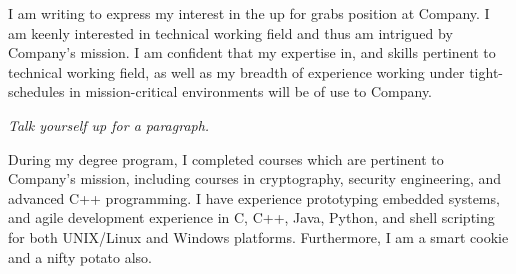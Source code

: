 \documentclass{coverletter}
\newcommand{\company}{Company}
\newcommand{\position}{up for grabs}
\newcommand{\workingfield}{technical working field}
\newcommand{\perks}{a smart cookie and a nifty potato also}
\newcommand{\courses}{cryptography, security engineering, and advanced C++ programming}
\newcommand{\experience}{prototyping embedded systems}
\newcommand{\proglangs}{C, C++, Java, Python, and shell scripting for both UNIX/Linux and Windows platforms}
\begin{document}
\address{}
\opening{}

  I am writing to express my interest in the \position{} 
  position at \company{}\postingsource{}.  I am keenly 
  interested in \workingfield{} and thus am intrigued by 
  \company{}'s mission. I am confident that my expertise in, 
  and skills pertinent to \workingfield{}, as well as my 
  breadth of experience working under tight-schedules in 
  mission-critical environments will be of use to \company{}.

  \textit{Talk yourself up for a paragraph.}
  \lipsum[8]

  During my degree program, I completed courses which are 
  pertinent to \company{}'s mission, including courses in
  \courses{}. I have experience \experience{}, and agile 
  development experience in \proglangs{}.  Furthermore, I am 
  \perks{}.
  
\closing{}
\end{document}
